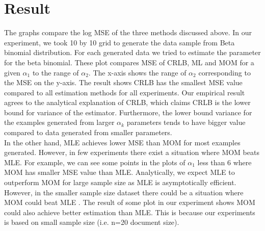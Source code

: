 \documentclass{article} %
\newcommand{\?}{\stackrel{?}{=}}
\begin{document}
\section{Result} \label{Result}
The graphs compare the log MSE of the three methods discussed above. In our experiment, we took 10 by 10 grid to generate the data sample from Beta binomial distribution. For each generated data we tried to estimate the parameter for the beta binomial. These plot compares MSE of CRLB, ML and MOM for a given $\alpha_1$  to the range of $\alpha_2$. The x-axis shows the range of $\alpha_2$ corresponding to the MSE on the y-axis. 
The result shows CRLB has the smallest MSE value compared to all estimation methods for all experiments. Our empirical result agrees to the analytical explanation of CRLB, which claims CRLB is the lower bound for variance of the estimator. Furthermore, the lower bound variance for the examples generated from larger $\alpha_k$ parameters tends to have bigger value compared to data generated from smaller parameters.\\ 
In the other hand, MLE achieves lower MSE than MOM  for most examples generated. However, in few experiments there exist a situation where MOM beats MLE. For example, we can see some points in the plots of $\alpha_1$ less than 6 where MOM has smaller MSE value than MLE. Analytically, we expect MLE to outperform MOM for large sample size as MLE is asymptotically efficient. However, in the smaller sample size dataset there could be a situation where MOM could beat MLE . The result of some plot in our experiment shows MOM could also achieve better estimation than MLE. This is because our experiments is based on small sample size (i.e. n=20 document size). 

 

\end{document}
